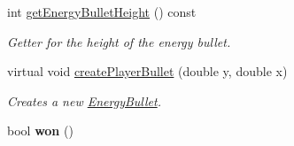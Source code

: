 \begin{DoxyCompactItemize}
int \hyperlink{classGameLogic_1_1Level_aa0b405c02ad398d415b2f378825d2c5b}{get\+Energy\+Bullet\+Height} () const
\begin{DoxyCompactList}\small\item\em Getter for the height of the energy bullet. \end{DoxyCompactList}\item 
virtual void \hyperlink{classGameLogic_1_1Level_ad9ac3fbb69cbfe7552a5ce8737a4cfd5}{create\+Player\+Bullet} (double y, double x)
\begin{DoxyCompactList}\small\item\em Creates a new \hyperlink{classGameLogic_1_1EnergyBullet}{Energy\+Bullet}. \end{DoxyCompactList}\item 
\mbox{\label{classGameLogic_1_1Level_aab512e6cb8c1d3d4d703cc7e85d75391}} 
bool {\bfseries won} ()
\end{DoxyCompactItemize}
